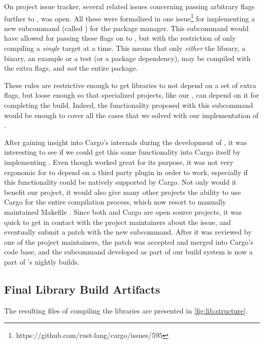 On {\cargo} project issue tracker, several related issues concerning passing arbitrary flags further to {\rustc}, was open.
All these were formalized in one issue\footnote{https://github.com/rust-lang/cargo/issues/595} for implementing a new subcommand (called ) for the package manager.
This subcommand would have allowed for passing these flags on to {\rustc}, but with the restriction of only compiling a \emph{single} target at a time.
This means that only \emph{either} the library, a binary, an example or a test (or a package dependency), may be compiled with the extra flags, and \emph{not} the entire package.

These rules are restrictive enough to get libraries to not depend on a set of extra flags, but loose enough so that specialized projects, like our {\emlib}, can depend on it for completing the build.
Indeed, the functionality proposed with this subcommand would be enough to cover all the cases that we solved with our implementation of .

After gaining insight into Cargo's internals during the development of , it was interesting to see if we could get this same functionality into Cargo itself by implementing .
Even though  worked great for its purpose, it was not very ergonomic for {\emlib} to depend on a third party plugin in order to work, especially if this functionality could be natively supported by Cargo.
Not only would it benefit our project, it would also give many other {\rust} projects the ability to use Cargo for the entire compilation process, which now resort to manually maintained Makefile \cite{}.
Since both {\rust} and Cargo are open source projects, it was quick to get in contact with the project maintainers about the issue, and eventually submit a patch with the new subcommand.
After it was reviewed by one of the project maintainers, the patch was accepted and merged into Cargo's code base, and the subcommand developed as part of our build system is now a part of {\rust}'s nightly builds.

\subsection{Final Library Build Artifacts}

The resulting files of compiling the libraries are presented in \autoref{fig:lib:structure}.

